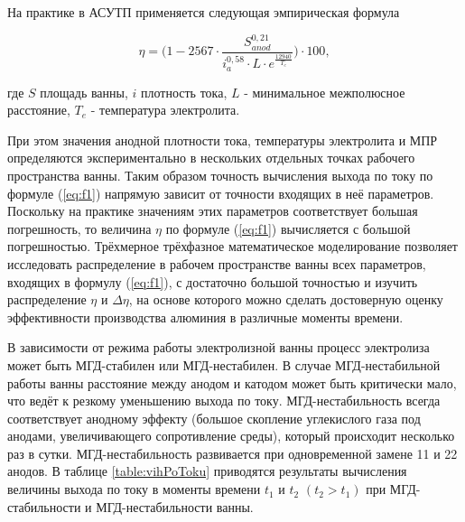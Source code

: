 \documentclass[pdflatex,sn-mathphys-gost]{pmi-jnl}
\begin{document}
На практике в АСУТП применяется следующая эмпирическая формула \cite{litlink:VAMI}

\begin{equation}\label{eq:f1}
	\eta = \bigg(1-2567 \cdot \frac{S^{0,21}_{anod}}{i^{0,58}_{a}\cdot L \cdot e^{\frac{12940}{T_e}}}\bigg) \cdot 100,
\end{equation}

где $S$ площадь ванны, $i$ плотность тока, $L$ - минимальное межполюсное расстояние, $T_e$ - температура электролита.

При этом значения анодной плотности тока, температуры электролита и МПР определяются экспериментально в нескольких отдельных точках рабочего пространства ванны.
Таким образом точность вычисления выхода по току по формуле (\ref{eq:f1}) напрямую зависит от точности входящих в неё параметров. Поскольку на практике значениям этих параметров соответствует большая погрешность, то величина $\eta$ по формуле (\ref{eq:f1}) вычисляется с большой погрешностью. Трёхмерное трёхфазное математическое моделирование \cite{litlink:kalmykov} позволяет исследовать распределение в рабочем пространстве ванны всех параметров, входящих в формулу (\ref{eq:f1}), с достаточно большой точностью и изучить распределение $\eta$ и $\Delta\eta$, на основе которого можно сделать достоверную оценку эффективности производства алюминия в различные моменты времени.

В зависимости от режима работы электролизной ванны процесс электролиза может быть МГД-стабилен или МГД-нестабилен. В случае МГД-нестабильной работы ванны расстояние между анодом и катодом может быть критически мало, что ведёт к резкому уменьшению выхода по току. МГД-нестабильность всегда соответствует анодному эффекту (большое скопление углекислого газа под анодами, увеличивающего сопротивление среды), который происходит несколько раз в сутки. МГД-нестабильность развивается при одновременной замене 11 и 22 анодов. В таблице \ref{table:vihPoToku} приводятся результаты вычисления величины выхода по току в моменты времени $t_1$ и $t_2$ $(t_2>t_1)$ при МГД-стабильности и МГД-нестабильности ванны.
\end{document}
